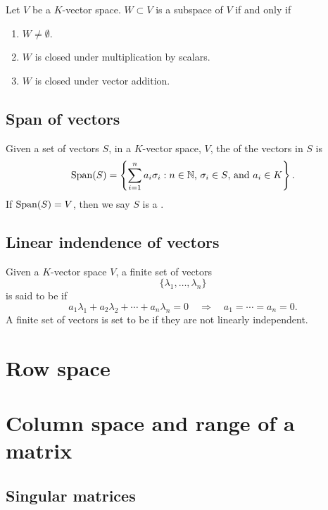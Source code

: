 \documentclass{ximera}
\begin{document}
\begin{lemma}
  Let $V$ be a $K$-vector space. $W\subset V$ is a subspace of $V$ if
  and only if
  \begin{enumerate}
  \item $W\ne \emptyset$.
  \item $W$ is closed under multiplication by scalars.
  \item $W$ is closed under vector addition.
  \end{enumerate}
\end{lemma}

\subsection{Span of vectors}

\begin{definition}
  Given a set of vectors $S$, in a $K$-vector space, $V$, the
   of the vectors in $S$ is
  \[
  \operatorname{Span}(S) = \left\{\sum_{i=1}^n a_i\sigma_i:\text{$n\in \mathbb N$,
    $\sigma_i\in S$, and $a_i\in K$}\right\}.
  \]
  If $\operatorname{Span}(S) = V$, then we say $S$ is a .
\end{definition}

\subsection{Linear indendence of vectors}


\begin{definition}
  Given a $K$-vector space $V$, a finite set of vectors
  \[
  \{\lambda_1,\dots,\lambda_n\}
  \]
  is said to be  if
  \[
  a_1\lambda_1 + a_2\lambda_2 +\cdots + a_n\lambda_n = 0\quad \Rightarrow \quad a_1= \cdots =a_n = 0.
  \]
  A finite set of vectors is set to be  if
  they are not linearly independent.
\end{definition}



\section{Row space}

\section{Column space and range of a matrix}

\subsection{Singular matrices}
\end{document}
